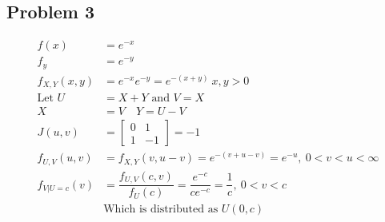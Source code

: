 \documentclass{article}
\begin{document}
\begin{flushleft}
\section*{Problem 3}
\begin{align*}
f(x)&=e^{-x}\\
f_y&=e^{-y}\\
f_{X,Y}(x,y)&=e^{-x}e^{-y}=e^{-(x+y)} \ x,y>0\\
\text{Let } U&=X+Y \text{ and } V=X\\
X&=V \quad Y=U-V\\
J(u,v)&=\begin{bmatrix}
0 & 1\\
1 & -1
\end{bmatrix}=-1\\
f_{U,V}(u,v)&=f_{X,Y}(v,u-v)=e^{-(v+u-v)}=e^{-u}, \ 0<v<u<\infty\\
f_{V|U=c}(v)&=\dfrac{f_{U,V}(c,v)}{f_U(c)}=\dfrac{e^{-c}}{ce^{-c}}=\dfrac{1}{c}, \ 0<v<c\\
&\text{Which is distributed as } U(0,c)
\end{align*}
\pagebreak

\end{flushleft}
\end{document}
